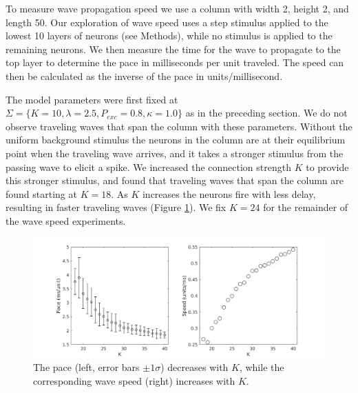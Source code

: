\documentclass[a4paper,11pt]{article}
\begin{document}
To measure wave propagation speed we use a column with width 2, height 2, and length 50.
Our exploration of wave speed uses a step stimulus applied to the lowest 10 layers of neurons (see Methods), while no stimulus is applied to the remaining neurons.
We then measure the time for the wave to propagate to the top layer to determine the pace in milliseconds per unit traveled.
The speed can then be calculated as the inverse of the pace in units/millisecond.

The model parameters were first fixed at $\Sigma = \{K=10,\lambda=2.5,P_{exc}=0.8,\kappa=1.0 \}$ as in the preceding section.
We do not observe traveling waves that span the column with these parameters.
Without the uniform background stimulus the neurons in the column are at their equilibrium point when the traveling wave arrives, and it takes a stronger stimulus from the passing wave to elicit a spike.
We increased the connection strength $K$ to provide this stronger stimulus, and found that traveling waves that span the column are found starting at $K=18$. 
As $K$ increases the neurons fire with less delay, resulting in faster traveling waves (Figure \ref{fig:delay_k}).
We fix $K=24$ for the remainder of the wave speed experiments.
\begin{figure}[!htb]
 \caption{The pace (left, error bars $\pm 1 \sigma$) decreases with $K$, while the corresponding wave speed (right) increases with $K$. }
 \label{fig:delay_k}
 \centering
   \includegraphics[width=\textwidth]{fig/WaveSpeed_K}
\end{figure}

\FloatBarrier
\end{document}
